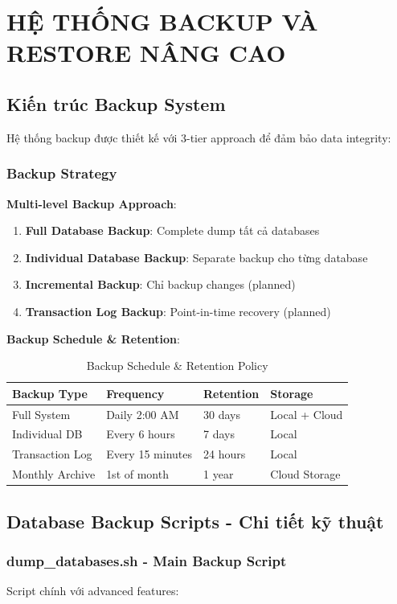 \documentclass[12pt,a4paper]{article}
\begin{document}
\section{HỆ THỐNG BACKUP VÀ RESTORE NÂNG CAO}

\subsection{Kiến trúc Backup System}
Hệ thống backup được thiết kế với 3-tier approach để đảm bảo data integrity:

\subsubsection{Backup Strategy}
\textbf{Multi-level Backup Approach}:
\begin{enumerate}
    \item \textbf{Full Database Backup}: Complete dump tất cả databases
    \item \textbf{Individual Database Backup}: Separate backup cho từng database
    \item \textbf{Incremental Backup}: Chỉ backup changes (planned)
    \item \textbf{Transaction Log Backup}: Point-in-time recovery (planned)
\end{enumerate}

\textbf{Backup Schedule \& Retention}:
\begin{table}[H]
\centering
\begin{tabular}{@{}llll@{}}
\toprule
\textbf{Backup Type} & \textbf{Frequency} & \textbf{Retention} & \textbf{Storage} \\
\midrule
Full System & Daily 2:00 AM & 30 days & Local + Cloud \\
Individual DB & Every 6 hours & 7 days & Local \\
Transaction Log & Every 15 minutes & 24 hours & Local \\
Monthly Archive & 1st of month & 1 year & Cloud Storage \\
\bottomrule
\end{tabular}
\caption{Backup Schedule \& Retention Policy}
\end{table}

\subsection{Database Backup Scripts - Chi tiết kỹ thuật}
\subsubsection{dump\_databases.sh - Main Backup Script}
Script chính với advanced features:
\end{document}

